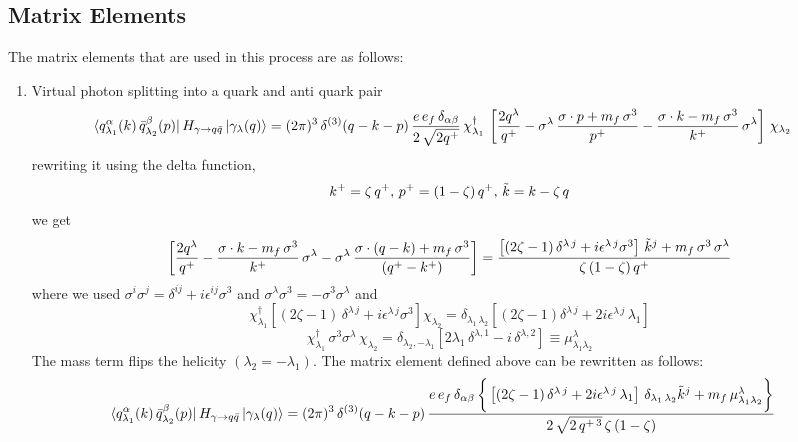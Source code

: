 \documentclass[9pt]{article}
\numberwithin{equation}{section}
\begin{document}
\subsection{Matrix Elements}
The matrix elements that are used in this process are as follows:
\begin{enumerate}
\item Virtual photon splitting into a quark and anti quark pair
\begin{align}
    \bra{q^{\alpha}_{\lambda_{1}}(k)\,\Bar{q}^{\beta}_{\lambda_{2}}(p)}H_{\gamma\rightarrow q\Bar{q}}\ket{\gamma_{\lambda}(q)} & = (2\pi)^{3}\, \delta^{(3)}(q-k-p)\, \frac{e\,e_{f}\,\delta_{\alpha\beta}}{2\,\sqrt{2q^{+}}}\, \chi^{\dagger}_{\lambda_{1}}\,\left[\frac{2q^{\lambda}}{q^{+}}-\sigma^{\lambda}\,\frac{\sigma\cdot p+m_{f}\,\sigma^{3}}{p^{+}}- \frac{\sigma\cdot k-m_{f}\,\sigma^{3}}{k^{+}}\,\sigma^{\lambda}\right]\,\chi_{\lambda_{2}}
\end{align}
rewriting it using the delta function,
$$k^{+} = \zeta\,q^{+}, \, p^{+} = (1-\zeta)\,q^{+}, \, \Tilde{k} = k-\zeta\,q$$
we get
$$\left[\frac{2q^{\lambda}}{q^{+}}-\frac{\sigma\cdot k - m_{f}\,\sigma^{3}}{k^{+}}\,\sigma^{\lambda}-\sigma^{\lambda}\, \frac{\sigma\cdot (q-k)+m_{f}\,\sigma^{3}}{(q^{+}-k^{+})}\right] = \frac{\left[(2\zeta -1)\,\delta^{\lambda\,j} + i\epsilon^{\lambda\, j}\sigma^{3}\right]\,\Tilde{k}^{j}+m_{f}\,\sigma^{3}\,\sigma^{\lambda}}{\zeta\,(1-\zeta)\,q^{+}}$$
where we used $\sigma^{i}\sigma^{j} = \delta^{ij} +i\epsilon^{ij}\sigma^{3}$ and $\sigma^{\lambda}\sigma^{3} = - \sigma^{3}\sigma^{\lambda}$
and $$\chi^{\dagger}_{\lambda_{1}}\left[(2\zeta -1)\,\delta^{\lambda\,j} + i\epsilon^{\lambda\, j}\sigma^{3}\right]\chi_{\lambda_{2}} = \delta_{\lambda_{1}\,\lambda_{2}}\left[(2\zeta - 1)\delta^{\lambda\,j} +2i\epsilon^{\lambda\,j}\,\lambda_{1}\right]$$
$$\chi^{\dagger}_{\lambda_{1}}\,\sigma^{3}\sigma^{\lambda}\,\chi_{\lambda_{2}} = \delta_{\lambda_{2},-\lambda_{1}} \left[2\lambda_{1}\,\delta^{\lambda,1} - i\,\delta^{\lambda,2}\right] \equiv \mu^{\lambda}_{\lambda_{1}\lambda_{2}}$$
The mass term flips the helicity $(\lambda_{2} = -\lambda_{1})$. The matrix element defined above can be rewritten as follows:
\begin{align}
    \bra{q^{\alpha}_{\lambda_{1}}(k)\,\Bar{q}^{\beta}_{\lambda_{2}}(p)}H_{\gamma\rightarrow q\Bar{q}}\ket{\gamma_{\lambda}(q)} & = (2\pi)^{3}\, \delta^{(3)}(q-k-p)\, \frac{e\,e_{f}\,\delta_{\alpha\beta}\,\bigg\{\left[(2\zeta -1)\,\delta^{\lambda\,j}+2i\epsilon^{\lambda\,j}\,\lambda_{1}\right]\,\delta_{\lambda_{1}\,\lambda_{2}}\Tilde{k}^{j}+m_{f}\,\mu^{\lambda}_{\lambda_{1}\lambda_{2}}\bigg\}}{2\,\sqrt{2\,q^{+\,3}}\, \zeta\,(1-\zeta)}

\end{align}
\end{enumerate}
\end{document}
